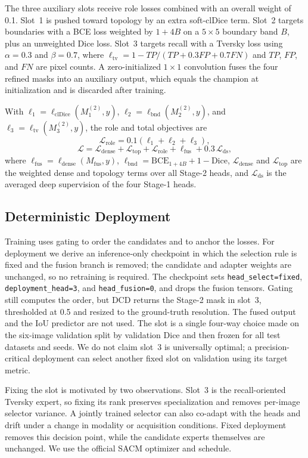 The three auxiliary slots receive role losses combined with an overall weight
of 0.1. Slot~1 is pushed toward topology by an extra soft-clDice term. Slot~2
targets boundaries with a BCE loss weighted by $1+4B$ on a $5\times5$ boundary
band $B$, plus an unweighted Dice loss. Slot~3 targets recall with a Tversky loss using
$\alpha=0.3$ and $\beta=0.7$, where
$\ell_{\mathrm{tv}}=1-TP/(TP+0.3FP+0.7FN)$ and $TP$, $FP$, and $FN$ are pixel
counts. A zero-initialized $1\times1$ convolution fuses the four refined masks
into an auxiliary output, which equals the champion at initialization and is
discarded after training.

With $\ell_1=\ell_{\mathrm{clDice}}(M_1^{(2)},y)$,
$\ell_2=\ell_{\mathrm{bnd}}(M_2^{(2)},y)$, and
$\ell_3=\ell_{\mathrm{tv}}(M_3^{(2)},y)$, the role and total objectives are
\begin{equation}
\mathcal{L}_{\mathrm{role}}=0.1\left(\ell_1+\ell_2+\ell_3\right),
\label{eq:role}
\end{equation}
\begin{equation}
\mathcal{L}=\mathcal{L}_{\mathrm{dense}}+\mathcal{L}_{\mathrm{top}}
+\mathcal{L}_{\mathrm{role}}+\ell_{\mathrm{fus}}+0.3\,\mathcal{L}_{\mathrm{ds}},
\label{eq:total}
\end{equation}
where $\ell_{\mathrm{fus}}=\ell_{\mathrm{dense}}(M_{\mathrm{fus}},y)$,
$\ell_{\mathrm{bnd}}=\mathrm{BCE}_{1+4B}+1-\mathrm{Dice}$,
$\mathcal{L}_{\mathrm{dense}}$ and $\mathcal{L}_{\mathrm{top}}$ are the
weighted dense and topology terms over all Stage-2 heads, and
$\mathcal{L}_{\mathrm{ds}}$ is the averaged deep supervision of the four
Stage-1 heads.

\subsection{Deterministic Deployment}
\label{sec:method_deploy}

Training uses gating to order the candidates and to anchor the losses. For
deployment we derive an inference-only checkpoint in which the selection rule
is fixed and the fusion branch is removed; the candidate and adapter weights
are unchanged, so no retraining is required. The checkpoint sets
\texttt{head\_select=fixed}, \texttt{deployment\_head=3}, and
\texttt{head\_fusion=0}, and drops the fusion tensors. Gating still computes
the order, but DCD returns the Stage-2 mask in slot~3, thresholded at 0.5 and
resized to the ground-truth resolution. The fused output and the IoU predictor
are not used. The slot is a single four-way choice made on the six-image validation split
by validation Dice and then frozen for all test datasets and seeds. We do not
claim slot~3 is universally optimal; a precision-critical deployment can
select another fixed slot on validation using its target metric.

Fixing the slot is motivated by two observations. Slot~3 is the
recall-oriented Tversky expert, so fixing its rank preserves specialization
and removes per-image selector variance. A jointly trained selector can also
co-adapt with the heads and drift under a change in modality or acquisition
conditions. Fixed deployment removes this decision point, while the candidate
experts themselves are unchanged. We use the official SACM optimizer and
schedule.
